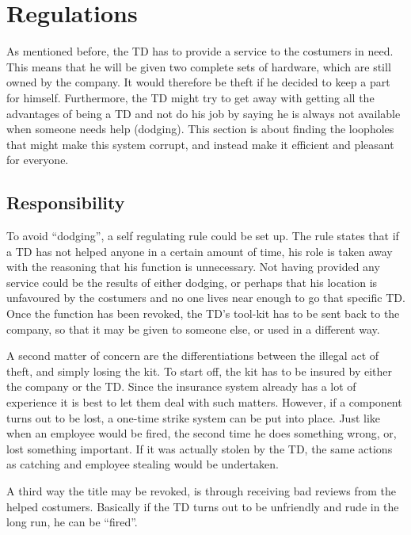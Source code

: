 \documentclass[final]{scrreprt} %
\begin{document}

\section{Regulations}\label{sec:regulations}
As mentioned before, the TD has to provide a service to the costumers in need. This means that he will be given two complete sets of hardware, which are still owned by the company. It would therefore be theft if he decided to keep a part for himself. Furthermore, the TD might try to get away with getting all the advantages of being a TD and not do his job by saying he is always not available when someone needs help (dodging). This section is about finding the loopholes that might make this system corrupt, and instead make it efficient and pleasant for everyone.

\subsection{Responsibility}
To avoid ``dodging'', a self regulating rule could be set up. The rule states that if a TD has not helped anyone in a certain amount of time, his role is taken away with the reasoning that his function is unnecessary. Not having provided any service could be the results of either dodging, or perhaps that his location is unfavoured by the costumers and no one lives near enough to go that specific TD. Once the function has been revoked, the TD's tool-kit has to be sent back to the company, so that it may be given to someone else, or used in a different way.

A second matter of concern are the differentiations between the illegal act of theft, and simply losing the kit. To start off, the kit has to be insured by either the company or the TD. Since the insurance system already has a lot of experience it is best to let them deal with such matters. However, if a component turns out to be lost, a one-time strike system can be put into place. Just like when an employee would be fired, the second time he does something wrong, or, lost something important. If it was actually stolen by the TD, the same actions as catching and employee stealing would be undertaken. 

A third way the title may be revoked, is through receiving bad reviews from the helped costumers. Basically if the TD turns out to be unfriendly and rude in the long run, he can be ``fired''.
\end{document}
